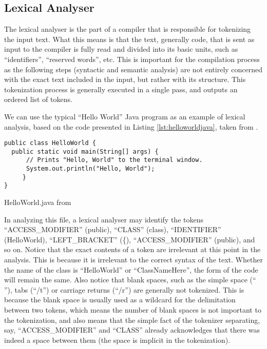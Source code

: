 
\subsection{Lexical Analyser}

The lexical analyser is the part of a compiler that is responsible for tokenizing the input text. What this means is that the text, generally code, that is sent as input to the compiler is fully read and divided into its basic units, such as ``identifiers'', ``reserved words'', etc. This is important for the compilation process as the following steps (syntactic and semantic analysis) are not entirely concerned with the exact text included in the input, but rather with its structure. This tokenization process is generally executed in a single pass, and outputs an ordered list of tokens.

We can use the typical ``Hello World'' Java program as an example of lexical analysis, based on the code presented in Listing \ref{lst:helloworldjava}, taken from \cite{SEDGEWICK:2011}.

\begin{listing}
\begin{verbatim}
public class HelloWorld {
  public static void main(String[] args) {
      // Prints "Hello, World" to the terminal window.
      System.out.println("Hello, World");
     }
}
\end{verbatim}
\caption{HelloWorld.java from \cite{SEDGEWICK:2011}} \label{lst:helloworldjava}
\end{listing}

In analyzing this file, a lexical analyser may identify the tokens ``ACCESS_MODIFIER'' (public), ``CLASS'' (class), ``IDENTIFIER'' (HelloWorld), ``LEFT_BRACKET'' (\{), ``ACCESS_MODIFIER'' (public), and so on. Notice that the exact contents of a token are irrelevant at this point in the analysis. This is because it is irrelevant to the correct syntax of the text. Whether the name of the class is ``HelloWorld'' or ``ClassNameHere'', the form of the code will remain the same. Also notice that blank spaces, such as the simple space (`` ''), tabs (``/t'') or carriage returns (``/r'') are generally not tokenized. This is because the blank space is usually used as a wildcard for the delimitation between two tokens, which means the number of blank spaces is not important to the tokenization, and also means that the simple fact of the tokenizer separating, say, ``ACCESS_MODIFIER'' and ``CLASS'' already acknowledges that there was indeed a space between them (the space is implicit in the tokenization).

